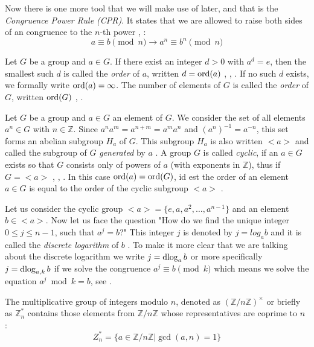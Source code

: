 Now there is one more tool that we will make use of later, and that is the \textit{Congruence Power Rule (CPR)}. It states that we are allowed to raise both sides of an congruence to the $n$-th power \cite[p.~19]{Ref_Mueller-Stach_2011}, \cite[p.~117]{Ref_Benjamin_2009}:
\begin{equation}
\label{eq:congruence_power_rule}
a\equiv b\pmod n\rightarrow a^n\equiv b^n\pmod n
\end{equation}

Let $G$ be a group and $a\in G$. If there exist an integer $d>0$ with $a^d=e$, then the smallest such $d$ is called the \textit{order} of $a$, written $d=\operatorname{ord}(a)$ \cite[p.~35]{Ref_Wolfart_2011}, \cite[p.~50]{Ref_Forster_2015}, \cite[p.~240]{Ref_Modler_Kreh_2012}. If no such $d$ exists, we formally write $\operatorname{ord}(a)=\infty$. The number of elements of $G$ is called the \textit{order} of $G$, written $\operatorname{ord}(G)$ \cite[p.~26]{Ref_Wolfart_2011}, \cite[p.~50]{Ref_Forster_2015}.

Let $G$ be a group and $a\in G$ an element of $G$. We consider the set of all elements $a^n\in G$ with $n\in\mathbb{Z}$. Since $a^na^m=a^{n+m}=a^ma^n$ and $(a^n)^{-1}=a^{-n}$, this set forms an abelian subgroup $H_a$ of $G$. This subgroup $H_a$ is also written $<a>$ and called the subgroup of $G$ \textit{generated} by $a$ \cite[p.~50]{Ref_Forster_2015}. A group $G$ is called \textit{cyclic}, if an $a\in G$ exists so that $G$ consists only of powers of $a$ (with exponents in $\mathbb{Z}$), thus if $G=<a>$ \cite[p.~34]{Ref_Wolfart_2011}, \cite[p.~50]{Ref_Forster_2015}, \cite[p.~240]{Ref_Modler_Kreh_2012}. In this case $\operatorname{ord}(a)=\operatorname{ord}(G)$, id est the order of an element $a\in G$ is equal to the order of the cyclic subgroup $<a>$ \cite[p.~50]{Ref_Forster_2015}.

Let us consider the cyclic group $<a>=\{e,a,a^2,\ldots,a^{n-1}\}$ and an element $b\in<a>$. Now let us face the question "How do we find the unique integer $0\le j\le n-1$, such that $a^j=b$?" This integer $j$ is denoted by $j=log_ab$ and it is called the \textit{discrete logarithm} of $b$ \cite[p.~255-256]{Ref_Stinson_Paterson_2019}. To make it more clear that we are talking about the discrete logarithm we write $j=\operatorname{dlog}_ab$ or more specifically $j=\operatorname{dlog}_{a,k}b$ if we solve the congruence $a^j\equiv b\pmod k$ which means we solve the equation $a^j\bmod k=b$, see \cite{Ref_Jain_2011}.

The multiplicative group of integers modulo $n$, denoted as $(\mathbb{Z}/n\mathbb{Z})^\times$ or briefly as $\mathbb{Z}_n^\ast$ contains those elements from $\mathbb{Z}/n\mathbb{Z}$ whose representatives are coprime to $n$ \cite[p.~87]{Ref_Teschl_2013}:
\begin{equation}
\label{eq:multiplicative_group_mod_n}
Z_n^\ast=\{a\in\mathbb{Z}/n\mathbb{Z}|\gcd(a,n)=1\}
\end{equation}


